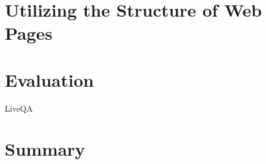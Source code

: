 %



\noindent

\section{Utilizing the Structure of Web Pages}

\section{Evaluation}
LiveQA


\section{Summary}
